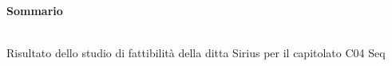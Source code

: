 \noindent\begin{Large}\textbf{Sommario}\end{Large}\\

\noindent Risultato dello studio di fattibilità della ditta Sirius per il capitolato C04 Seq\\